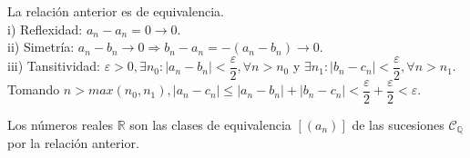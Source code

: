 \begin{prop}
  La relación anterior es de equivalencia. \\
  i) Reflexidad: $a_n - a_n = 0 \to 0$. \\
  ii) Simetría: $a_n - b_n \to 0 \Rightarrow b_n - a_n = -(a_n-b_n) \to 0$. \\
  iii) Tansitividad: $\varepsilon > 0, \exists n_0 : |a_n - b_n| < \dfrac{\varepsilon}{2}, \forall n > n_0$
  y $\exists n_1 : |b_n - c_n| < \dfrac{\varepsilon}{2}, \forall n > n_1$. Tomando $n > max(n_0, n_1), |a_n - c_n| \leq |a_n - b_n| + |b_n - c_n| < \dfrac{\varepsilon}{2} + \dfrac{\varepsilon}{2} < \varepsilon$.
\end{prop}

\begin{definition}
  Los números reales $\mathbb{R}$ son las clases de equivalencia $[(a_n)]$ de las sucesiones $\mathscr{C}_{\mathbb{Q}}$ por la relación anterior.
\end{definition}
